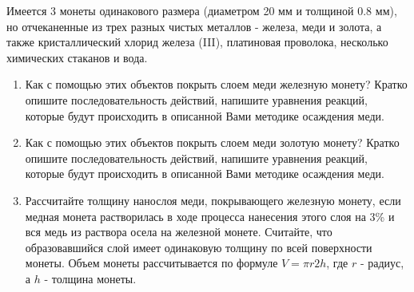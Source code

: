 
Имеется 3 монеты одинакового размера (диаметром 20 мм и толщиной 0.8 мм), но отчеканенные  из трех разных чистых 
металлов - железа, меди и золота, а также кристаллический хлорид железа (III), платиновая проволока, несколько 
химических стаканов и вода.

\begin{enumerate}
    \item Как с помощью этих объектов покрыть слоем меди железную монету? Кратко опишите последовательность действий, напишите уравнения реакций, которые будут происходить в описанной Вами методике осаждения меди.
    \item Как с помощью этих объектов покрыть слоем меди золотую монету? Кратко опишите последовательность действий, напишите уравнения реакций, которые будут происходить в описанной Вами методике осаждения меди.
    \item Рассчитайте толщину нанослоя меди, покрывающего железную монету, если медная монета растворилась в ходе 
    процесса нанесения этого слоя на 3\% и вся медь из раствора осела на железной монете. Считайте, что 
    образовавшийся слой имеет одинаковую толщину по всей поверхности монеты. Объем монеты рассчитывается по 
    формуле $V = \pi r2h$, где $r$ - радиус, а $h$ - толщина монеты.    
\end{enumerate}

